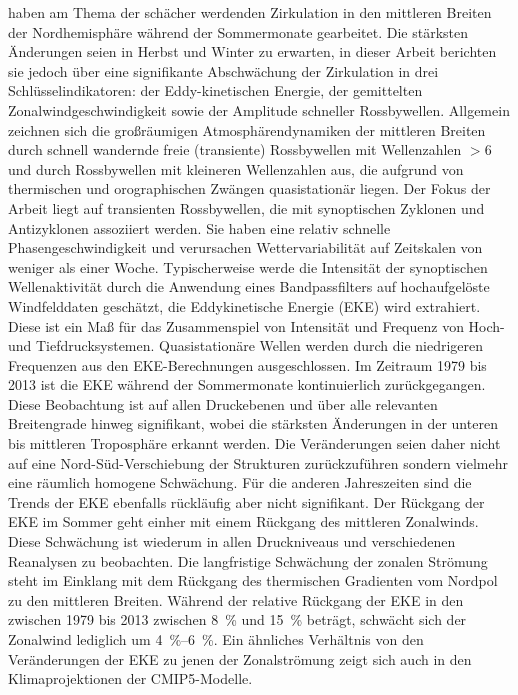 \citet{coumou-2015} haben am Thema der schächer werdenden Zirkulation in den mittleren Breiten der Nordhemisphäre während der Sommermonate gearbeitet. Die stärksten Änderungen seien in Herbst und Winter zu erwarten, in dieser Arbeit berichten sie jedoch über eine signifikante Abschwächung der Zirkulation in drei Schlüsselindikatoren: der Eddy-kinetischen Energie, der gemittelten Zonal\-wind\-ge\-schwin\-dig\-keit sowie der Amplitude schneller Rossbywellen. Allgemein zeichnen sich die großräumigen Atmosphärendynamiken der mittleren Breiten durch schnell wandernde freie (transiente) Rossbywellen mit Wellenzahlen $>6$ und durch Rossbywellen mit kleineren Wellenzahlen aus, die aufgrund von thermischen und orographischen Zwängen quasistationär liegen. Der Fokus der Arbeit liegt auf transienten Rossbywellen, die mit synoptischen Zyklonen und Antizyklonen assoziiert werden. Sie haben eine relativ schnelle Phasengeschwindigkeit und verursachen Wettervariabilität auf Zeitskalen von weniger als einer Woche. Typischerweise werde die Intensität der synoptischen Wellenaktivität durch die Anwendung eines Bandpassfilters auf hochaufgelöste Windfelddaten geschätzt, die Eddykinetische Energie (EKE) wird extrahiert. Diese ist ein Maß für das Zusammenspiel von Intensität und Frequenz von Hoch- und Tiefdrucksystemen. Quasistationäre Wellen werden durch die niedrigeren Frequenzen aus den EKE-Berechnungen ausgeschlossen. Im Zeitraum 1979 bis 2013 ist die EKE während der Sommermonate kontinuierlich zurückgegangen. Diese Beobachtung ist auf allen Druckebenen und über alle relevanten Breitengrade hinweg signifikant, wobei die stärksten Änderungen in der unteren bis mittleren Troposphäre erkannt werden. Die Veränderungen seien daher nicht auf eine Nord-Süd-Verschiebung der Strukturen zurückzuführen sondern vielmehr eine räumlich homogene Schwächung. Für die anderen Jahreszeiten sind die Trends der EKE ebenfalls rückläufig aber nicht signifikant. Der Rückgang der EKE im Sommer geht einher mit einem Rückgang des mittleren Zonalwinds. Diese Schwächung ist wiederum in allen Druckniveaus und verschiedenen Reanalysen zu beobachten. Die langfristige Schwächung der zonalen Strömung steht im Einklang mit dem Rückgang des thermischen Gradienten vom Nordpol zu den mittleren Breiten. Während der relative Rückgang der EKE in den zwischen 1979 bis 2013 zwischen \SI{8}{\percent} und \SI{15}{\percent} beträgt, schwächt sich der Zonalwind lediglich um \SIrange{4}{6}{\percent}. Ein ähnliches Verhältnis von den Veränderungen der EKE zu jenen der Zonalströmung zeigt sich auch in den Klimaprojektionen der CMIP5-Modelle. 

